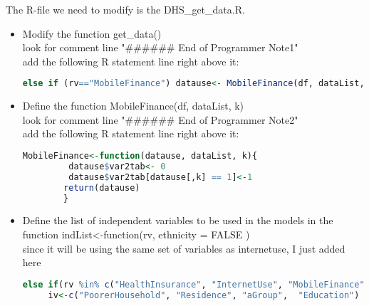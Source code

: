 \documentclass[12pt]{article}
\begin{document}
The R-file we need to modify is the DHS\_get\_data.R.
\begin{itemize}
\item{Modify the function get\_data()}\\
 look for comment line "\#\#\#\#\#\# End of Programmer Note1"\\
 add the following R statement line right above it: \\
 {\small 
  \begin{lstlisting}[language=R]
    else if (rv=="MobileFinance") datause<- MobileFinance(df, dataList, k)
  \end{lstlisting}
    }
\item{Define the function MobileFinance(df, dataList, k)}\\
 look for comment line "\#\#\#\#\#\# End of Programmer Note2"\\
  add the following R statement line right above it: \\
   {\small 
  \begin{lstlisting}[language=R]
   MobileFinance<-function(datause, dataList, k){
 		 datause$var2tab<- 0
  		 datause$var2tab[datause[,k] == 1]<-1
  		return(datause)
  		}
 \end{lstlisting}
 }
  		
 \item{Define the list of independent variables to be used in the models in the function indList<-function(rv, ethnicity = FALSE )}\\
 since it will be using the same set of variables as internetuse, I just added here \\
  {\small 
   \begin{lstlisting}[language=R]
     else if(rv %in% c("HealthInsurance", "InternetUse", "MobileFinance") )
     iv<-c("PoorerHousehold", "Residence", "aGroup",  "Education")
  \end{lstlisting}   
  }

\end{itemize}
\end{document}
